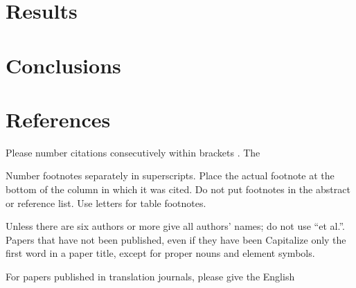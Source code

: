 \documentclass[conference]{IEEEtran}
\begin{document}
\section{Results}

\section{Conclusions}

\section*{References}

Please number citations consecutively within brackets \cite{gnewman}. The 

Number footnotes separately in superscripts. Place the actual footnote at 
the bottom of the column in which it was cited. Do not put footnotes in the 
abstract or reference list. Use letters for table footnotes.

Unless there are six authors or more give all authors' names; do not use 
``et al.''. Papers that have not been published, even if they have been 
Capitalize only the first word in a paper title, except for proper nouns and 
element symbols.

For papers published in translation journals, please give the English 
\end{document}
